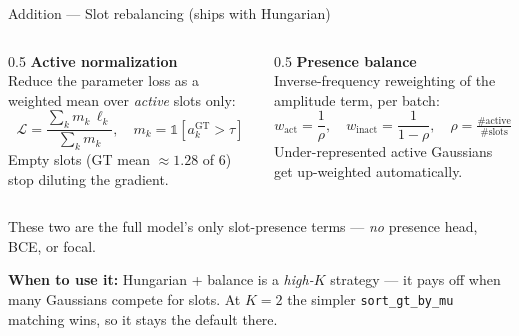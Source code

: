 \documentclass[aspectratio=169,10pt]{beamer}
\begin{document}
\begin{frame}{Addition --- Slot rebalancing (ships with Hungarian)}
  \small
  \begin{columns}[T]
    \begin{column}{0.5\textwidth}
      \textbf{Active normalization}\\
      Reduce the parameter loss as a weighted mean over \emph{active} slots only:
      \[
        \mathcal{L}=\frac{\sum_k m_k\,\ell_k}{\sum_k m_k},\quad m_k=\mathbb{1}[a_k^\text{GT}\!>\!\tau]
      \]
      {\scriptsize Empty slots (GT mean $\approx1.28$ of $6$) stop diluting the gradient.}
    \end{column}
    \begin{column}{0.5\textwidth}
      \textbf{Presence balance}\\
      Inverse-frequency reweighting of the amplitude term, per batch:
      \[
        w_\text{act}=\frac{1}{\rho},\quad w_\text{inact}=\frac{1}{1-\rho},\quad
        \rho=\tfrac{\#\text{active}}{\#\text{slots}}
      \]
      {\scriptsize Under-represented active Gaussians get up-weighted automatically.}
    \end{column}
  \end{columns}
  \vspace{4pt}
  \begin{center}\scriptsize
  These two are the full model's only slot-presence terms --- \emph{no} presence head, BCE, or focal.
  \end{center}
  \vspace{2pt}
  \begin{block}{}\scriptsize
    \textbf{When to use it:} Hungarian + balance is a \emph{high-$K$} strategy --- it pays off
    when many Gaussians compete for slots. At $K=2$ the simpler \texttt{sort\_gt\_by\_mu}
    matching wins, so it stays the default there.
  \end{block}
\end{frame}
\end{document}
